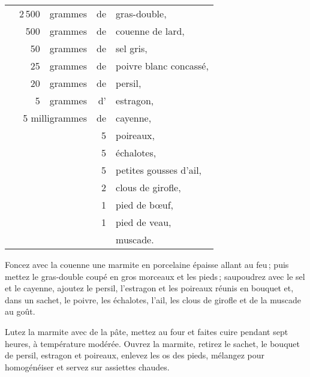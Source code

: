 \footnotesize
\begin{longtable}{rrrrp{18em}}
  & 2 500 & grammes & de & gras-double,                                                                  \\
  &   500 & grammes & de & couenne de lard,                                                              \\
  &    50 & grammes & de & sel gris,                                                                     \\
  &    25 & grammes & de & poivre blanc concassé,                                                        \\
  &    20 & grammes & de & persil,                                                                       \\
  &     5 & grammes & d' & estragon,                                                                     \\
  & \multicolumn{2}{r}{5 milligrammes} & de & cayenne,                                                   \\
  &       &         &  5 & poireaux,                                                                     \\
  &       &         &  5 & échalotes,                                                                    \\
  &       &         &  5 & petites gousses d'ail,                                                        \\
  &       &         &  2 & clous de girofle,                                                             \\
  &       &         &  1 & pied de bœuf,                                                                 \\
  &       &         &  1 & pied de veau,                                                                 \\
  &       &         &    & muscade.
\end{longtable}
\normalsize

Foncez avec la couenne une marmite en porcelaine épaisse allant au feu ; puis
mettez le gras-double coupé en gros morceaux et les pieds ; saupoudrez avec le
sel et le cayenne, ajoutez le persil, l'estragon et les poireaux réunis en
bouquet et, dans un sachet, le poivre, les échalotes, l'ail, les clous de
girofle et de la muscade au goût.

Lutez la marmite avec de la pâte, mettez au four et faites cuire pendant sept
heures, à température modérée. Ouvrez la marmite, retirez le sachet, le bouquet
de persil, estragon et poireaux, enlevez les os des pieds, mélangez pour
homogénéiser et servez sur assiettes chaudes.

